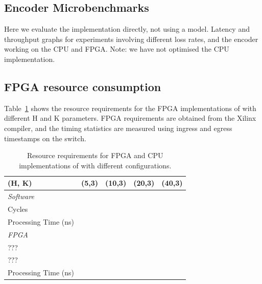 \subsection{Encoder Microbenchmarks}
Here we evaluate the implementation directly, not using a model.
Latency and throughput graphs for experiments involving different loss rates, and the encoder working on the CPU and FPGA.
Note: we have not optimised the CPU implementation.


\subsection{FPGA resource consumption}
Table~\ref{tab:microbenchmarks} shows the resource requirements for the FPGA implementations of
\OurSys with different H and K parameters.
FPGA requirements are obtained from the Xilinx compiler, and the
timing statistics are measured using ingress and egress timestamps on
the switch.


\begin{table}
\begin{center}
\small
\begin{tabular}{ l l l l l } 
\toprule
(H, K) & (5,3) & (10,3) & (20,3) & (40,3) \\
\midrule
\emph{Software} & & & & \\
\cmidrule{1-1}
Cycles & & & & \\
Processing Time (ns) & & & & \\
\midrule
\emph{FPGA} & & & & \\
\cmidrule{1-1}
??? & & & & \\
??? & & & & \\
Processing Time (ns) & & & & \\
\bottomrule

\end{tabular}
\caption{Resource requirements for FPGA and CPU implementations of \OurSys with different configurations.}
\label{tab:microbenchmarks}
\end{center}
\end{table}


